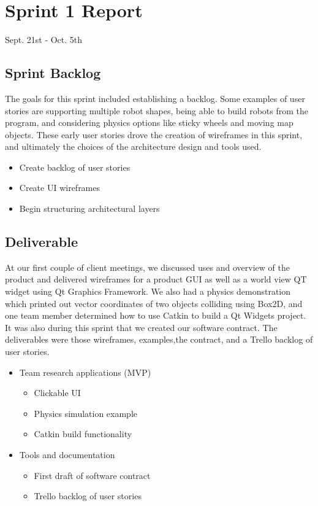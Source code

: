 \section{Sprint 1 Report}
Sept. 21st - Oct. 5th
\subsection{Sprint Backlog}

The goals for this sprint included establishing a backlog. Some examples of user stories are supporting multiple robot shapes, being able to build robots from the program, and considering physics options like sticky wheels and moving map objects. These early user stories drove the creation of wireframes in this sprint, and ultimately the choices of the architecture design and tools used.

\begin{itemize}
	\item Create backlog of user stories
	\item Create UI wireframes
	\item Begin structuring architectural layers
\end{itemize}

\subsection{Deliverable}

At our first couple of client meetings, we discussed uses and overview of the product and delivered wireframes for a product GUI as well as a world view QT widget using Qt Graphics Framework. We also had a physics demonstration which printed out vector coordinates of two objects colliding using Box2D, and one team member determined how to use Catkin to build a Qt Widgets project. It was also during this sprint that we created our software contract. The deliverables were those wireframes, examples,the contract, and a Trello backlog of user stories.

\begin{itemize}
	\item Team research applications (MVP)
	\begin{itemize}
		\item Clickable UI
		\item Physics simulation example
		\item Catkin build functionality
	\end{itemize}
	\item Tools and documentation
	\begin{itemize}
		\item First draft of software contract
		\item Trello backlog of user stories
	\end{itemize}
\end{itemize}

